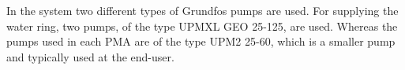 % 		 

In the system two different types of Grundfos pumps are used. For supplying the water ring, two pumps, of the type UPMXL GEO 25-125\cite{waterpump1}, are used. Whereas the pumps used in each PMA are of the type UPM2 25-60\cite{waterpump2}, which is a smaller pump and typically used at the end-user. 

